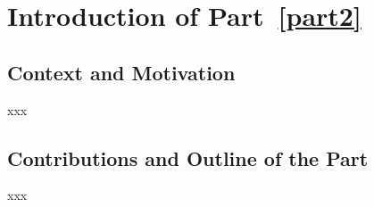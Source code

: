 \chapter{Introduction of Part~\ref{part2}}
\label{chapter:p2-ch7-introduction}
\localtableofcontents

\section{Context and Motivation}
\label{section:p2-ch7-context_and_motivation}

xxx



\section{Contributions and Outline of the Part}
\label{section:p2-ch7-contributions_and_outline_of_the_part}

xxx
